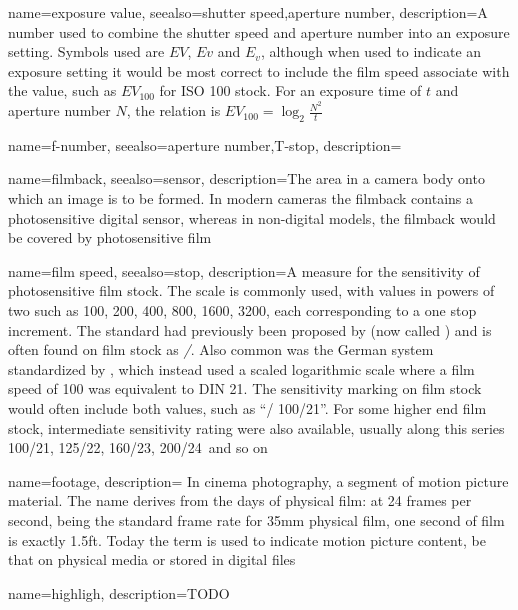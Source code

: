 {
	name={exposure value},
	seealso={shutter speed,aperture number},
	description={A number used to combine the shutter speed and aperture number into an
		exposure setting. 
		Symbols used are $EV$, $Ev$ and $E_v$, although when used to indicate an exposure 
		setting it would be most correct to include the film speed associate with the value, 
		such as $EV_{100}$ for ISO 100 stock.
		For an exposure time of $t$ and aperture number $N$, the relation is
		$EV_{100} = \log_2\frac{N^2}{t}$}
}

{
	name={f-number},
	seealso={aperture number,T-stop},
	description=\nopostdesc
}

{
	name=filmback,
	seealso={sensor},
	description={The area in a camera body onto which an image is to be formed. 
		In modern cameras the filmback contains a photosensitive digital sensor,
		whereas in non-digital models, the filmback would be covered by 
		photosensitive film}
}


{
	name={film speed},
	seealso={stop},
	description={A measure for the sensitivity of photosensitive film stock. 
		The  scale is commonly used, with values in powers of two such 
		as 100, 200, 400, 800, 1600, 3200, each corresponding to a one stop increment. 
		The standard had previously been proposed by 
		(now called ) and is often found on film stock as 
		\textsl{/}. 
		Also common was the German system standardized by , which instead 
		used a scaled logarithmic scale where a film speed of  100 was equivalent 
		to DIN 21\degree. 
		The sensitivity marking on film stock would often include both values, 
		such as ``/ 100/21\degree''. 
		For some higher end film stock, intermediate
		sensitivity rating were also available, usually along this series
		100/21\degree, 125/22\degree, 160/23\degree, 200/24\degree\ and so on}
}

{
	name=footage,
	description={
		In cinema photography, a segment of motion picture material. The name derives from
	    the days of physical film: at 24 frames per second, being the standard frame rate for
    	35\unit{\milli\meter} physical film, one second of film is exactly 1.5ft.
    	Today the term is used to indicate motion picture content, be that on physical
        media or stored in digital files}
}

{
	name=highligh,
	description={TODO}
}

